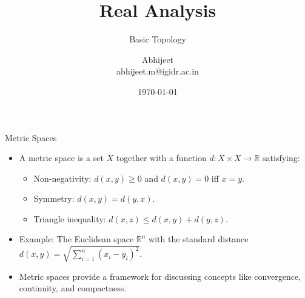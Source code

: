 \documentclass{beamer}
\title[Short Title]{Real Analysis}
\subtitle{Basic Topology}
\author[Author Short]{Abhijeet \\ \small abhijeet.m@igidr.ac.in}
\institute[Inst Short]{Mathematics for Economists \\  IGIDR}
\date{\today}
\begin{document}
\begin{frame}[plain]
  \titlepage
\end{frame}

\begin{frame}{Metric Spaces}
  \begin{itemize}

    \item A metric space is a set $X$ together with a function $d: X \times X \to \mathbb{R}$ satisfying:
    \begin{itemize}
      \item Non-negativity: $d(x,y) \geq 0$ and $d(x,y) = 0$ iff $x = y$.
      \item Symmetry: $d(x,y) = d(y,x)$.
      \item Triangle inequality: $d(x,z) \leq d(x,y) + d(y,z)$.
    \end{itemize}
    \item Example: The Euclidean space $\mathbb{R}^n$ with the standard distance $d(x,y) = \sqrt{\sum_{i=1}^n (x_i - y_i)^2}$.
    \item Metric spaces provide a framework for discussing concepts like convergence, continuity, and compactness.
  \end{itemize}
\end{frame}
\end{document}
